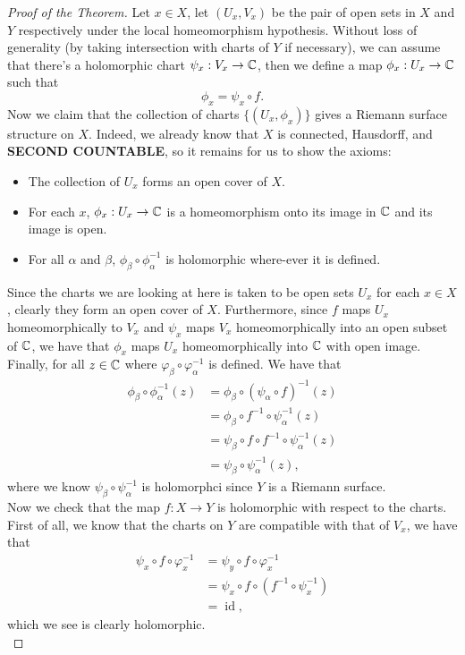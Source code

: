 \documentclass{article}
\begin{document}
\begin{proof}[Proof of the Theorem]
      Let $x \in X$, let $(U_x, V_x)$ be the pair of open sets in $X$ and $Y$ respectively under the local homeomorphism hypothesis. Without loss of generality (by taking intersection with charts of $Y$ if necessary), we can assume that there's a holomorphic chart $\psi_x: V_x \to \mathbb{C}$, then we define a map $\phi_x: U_x \to \mathbb{C}$ such that
    \[\phi_x = \psi_x \circ f.\]
    Now we claim that the collection of charts $\{(U_x, \phi_x)\}$ gives a Riemann surface structure on $X$. Indeed, we already know that $X$ is connected, Hausdorff, and \textbf{SECOND COUNTABLE}, so it remains for us to show the axioms:
    \begin{itemize}
        \item The collection of $U_x$ forms an open cover of $X$.
        \item For each $x$, $\phi_x: U_x \to \mathbb{C}$ is a homeomorphism onto its image in $\mathbb{C}$ and its image is open.
        \item For all $\alpha$ and $\beta$, $\phi_\beta \circ \phi_\alpha^{-1}$ is holomorphic where-ever it is defined.
    \end{itemize}
    Since the charts we are looking at here is taken to be open sets $U_x$ for each $x \in X$, clearly they form an open cover of $X$. Furthermore, since $f$ maps $U_x$ homeomorphically to $V_x$ and $\psi_x$ maps $V_x$ homeomorphically into an open subset of $\mathbb{C}$, we have that $\phi_x$ maps $U_x$ homeomorphically into $\mathbb{C}$ with open image.\\

    Finally, for all $z \in \mathbb{C}$ where $\varphi_\beta \circ \varphi_\alpha^{-1}$ is defined. We have that
    \begin{align*}
        \phi_\beta \circ \phi_\alpha^{-1}(z) &= \phi_\beta \circ (\psi_\alpha \circ f)^{-1}(z)\\
        &= \phi_\beta \circ f^{-1} \circ \psi_\alpha^{-1}(z) \tag*{Inverses are well-defined in the local sense}\\
        &= \psi_\beta \circ f \circ f^{-1} \circ \psi_\alpha^{-1}(z)\\
        &= \psi_\beta \circ \psi_\alpha^{-1}(z),
    \end{align*}
    where we know $\psi_\beta \circ \psi_\alpha^{-1}$ is holomorphci since $Y$ is a Riemann surface.\\

    Now we check that the map $f: X \to Y$ is holomorphic with respect to the charts. First of all, we know that the charts on $Y$ are compatible with that of $V_x$, we have that
    \begin{align*}
      \psi_x \circ f \circ \varphi_x^{-1} &= \psi_y \circ f \circ \varphi_x^{-1} \\
      &= \psi_x \circ f \circ (f^{-1} \circ \psi_x^{-1})\\
      &= \operatorname{id},
    \end{align*}
    which we see is clearly holomorphic.\\


\end{proof}
\end{document}
